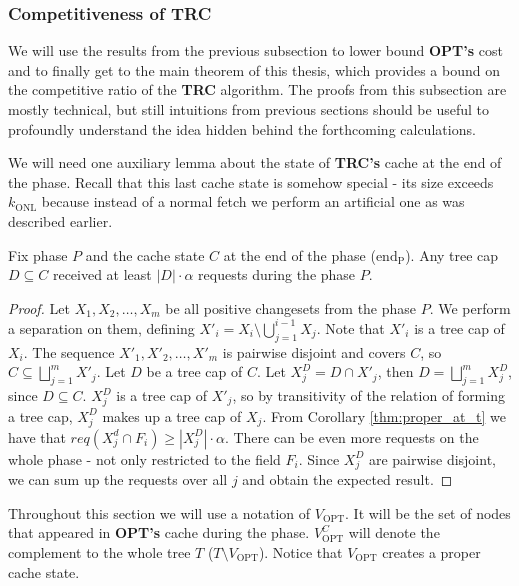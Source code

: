 \subsubsection{Competitiveness of TRC} We will use the results from the
previous subsection to lower bound \textbf{OPT's} cost and to finally get to the main
theorem of this thesis, which provides a bound on the competitive ratio of the \textbf{TRC}
algorithm. The proofs from this subsection are mostly technical, but still
intuitions from previous sections should be useful to profoundly understand the idea
hidden behind the forthcoming calculations.

We will need one auxiliary lemma about the state of \textbf{TRC's} cache at the
end of the phase. Recall that this last cache state is somehow special - its size
exceeds $k_{\mathrm{ONL}}$ because instead of a normal fetch we perform an 
artificial one as was described earlier. 
\begin{lemma} 
Fix phase $P$ and the
cache state  $C$ at the end of the phase ($\mathrm{end_P}$). Any tree cap $D
\subseteq C$ received at least $|D| \cdot \alpha$ requests during the phase $P$.
\label{thm:lots_of_req_in_tc_end_of_p} 
\end{lemma}
\begin{proof}
Let $X_1, X_2,
\ldots, X_m$ be all positive changesets from the phase $P$.  We perform a 
separation on them, defining $X'_i = X_i \setminus \bigcup_{j=1}^{i-1} X_j$.
Note that $X'_i$ is a tree cap of $X_i$. The sequence $X'_1, X'_2, \ldots, X'_m$
is pairwise disjoint and covers $C$, so $C \subseteq \bigsqcup_{j=1}^m X'_j$.
Let $D$ be a tree cap of $C$.
Let $X_j^D = D \cap X'_j$, then $D = \bigsqcup_{j=1}^m X_j^D$, since $D
\subseteq C$. $X_j^D$ is a tree cap of $X'_j$, so by transitivity of the relation
of forming a tree cap, $X_j^D$ makes up a tree cap of $X_j$. From Corollary
\ref{thm:proper_at_t} we have that $req(X_j^d \cap F_i) \geq |X_j^D| \cdot
\alpha$. There can be even more requests on the whole phase - not only
restricted to the field $F_i$. Since $X_j^D$ are pairwise disjoint, we can sum up
the requests over all $j$ and obtain the expected result.  \end{proof}


Throughout this section we will use a notation of $V_{\mathrm{OPT}}$. It will be
the set of nodes that appeared in \textbf{OPT's} cache during the phase.
$V_{\mathrm{OPT}}^C$ will denote the complement to the whole tree $T$ ($T
\setminus V_{\mathrm{OPT}}$). Notice that $V_{\mathrm{OPT}}$ creates a proper
cache state.

